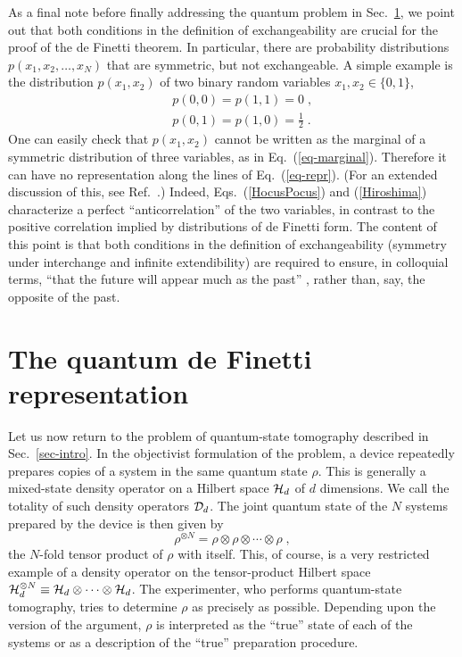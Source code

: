 \documentclass[12pt,aps,eqsecnum]{revtex4-1}
\begin{document}
As a final note before finally addressing the quantum problem in
Sec.~\ref{sec-quantum}, we point out that both conditions in the
definition of exchangeability are crucial for the proof of the de
Finetti theorem.  In particular, there are probability
distributions $p(x_1,x_2,\ldots,x_N)$ that are symmetric, but not
exchangeable.  A simple example is the distribution $p(x_1,x_2)$
of two binary random variables $x_1,x_2\in\{0,1\}$,
\begin{eqnarray}
&& p(0,0) = p(1,1) = 0\;,
\label{HocusPocus}
\\
&& p(0,1) = p(1,0) = \frac{1}{2} \;.
\label{Hiroshima}
\end{eqnarray}
One can easily check that $p(x_1,x_2)$ cannot be written as the
marginal of a symmetric distribution of three variables, as in
Eq.~(\ref{eq-marginal}). Therefore it can have no representation
along the lines of Eq.~(\ref{eq-repr}).  (For an extended
discussion of this, see Ref.~\cite{Jaynes1986}.)  Indeed,
Eqs.~(\ref{HocusPocus}) and (\ref{Hiroshima}) characterize a
perfect ``anticorrelation'' of the two variables, in contrast to
the positive correlation implied by distributions of de Finetti
form.  The content of this point is that both conditions in the
definition of exchangeability (symmetry under interchange and
infinite extendibility) are required to ensure, in colloquial
terms, ``that the future will appear much as the past''
\cite{vonPlato1989}, rather than, say, the opposite of the past.

\section{The quantum de Finetti representation} \label{sec-quantum}

Let us now return to the problem of quantum-state tomography
described in Sec.~\ref{sec-intro}. In the objectivist formulation of
the problem, a device repeatedly prepares copies of a system in the
same quantum state $\rho$. This is generally a mixed-state density
operator on a Hilbert space ${\cal H}_d$ of $d$ dimensions. We call
the totality of such density operators ${\cal D}_d$.  The joint
quantum state of the $N$ systems prepared by the device is then
given by
\begin{equation}
\rho^{\otimes N}=\rho\otimes\rho\otimes\cdots\otimes\rho \;,
\end{equation}
the $N$-fold tensor product of $\rho$ with itself. This, of
course, is a very restricted example of a density operator on the
tensor-product Hilbert space ${\cal H}_d^{\otimes N}\equiv {\cal
H}_d\otimes\cdots\otimes{\cal H}_d$. The experimenter, who
performs quantum-state tomography, tries to determine $\rho$ as
precisely as possible. Depending upon the version of the argument,
$\rho$ is interpreted as the ``true'' state of each of the systems
or as a description of the ``true'' preparation procedure.
\end{document}
